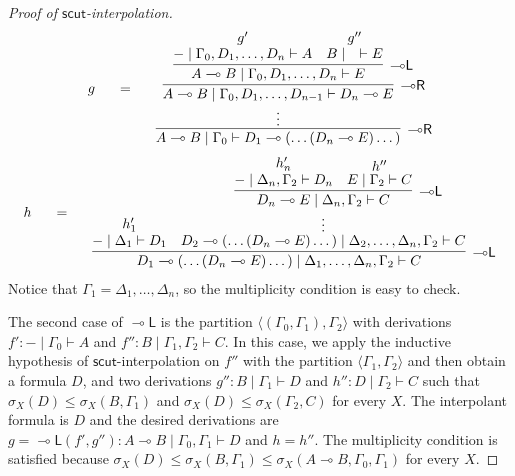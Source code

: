 \documentclass[sn-mathphys-num]{sn-jnl}%
\newcommand{\GG}{\Gamma}
\newcommand{\GD}{\Delta}
\newcommand{\vd}{\vdash}
\newcommand{\lolli}{\multimap}
\newcommand{\lleft}{{\lolli}\mathsf{L}}
\newcommand{\lright}{{\lolli}\mathsf{R}}
\newcommand{\mf}[1]{\mathsf{#1}}
\newcommand{\gs}[1]{\sigma_{X} (#1)}
\theoremstyle{thmstyleone}%
\theoremstyle{thmstyletwo}%
\theoremstyle{thmstylethree}%
\begin{document}
\begin{proof}[Proof of $\mf{scut}$-interpolation]
\begin{displaymath}
\begin{array}{c}
  \begin{array}{c}
    g
  \end{array}
  \quad 
  =
  \quad
    \begin{array}{c}
      \infer[\lright]{A\lolli B \mid \GG_0 \vd D_1 \lolli (\dots (D_n \lolli E)\dots)}{
      \deduce{\vdots}{
        \infer[\lright]{A \lolli B \mid \GG_0 , D_1, \dots ,D_{n-1} \vd D_n \lolli E}{
        \infer[\lleft]{A \lolli B \mid \GG_0 , D_1, \dots, D_n \vd E}{
          \deduce{{-} \mid \GG_0 , D_1, \dots, D_n \vd A}{g'}
          &
          \deduce{B \mid \quad \vd E}{g''}
        }
      }
      }
    }
    \end{array}
  \end{array}
\end{displaymath}
\begin{displaymath}
    \begin{array}{c}
      h
    \end{array}
    \quad
    =
    \quad
    \begin{array}{c}
      \infer[\lleft]{D_1 \lolli (\dots (D_n \lolli E)\dots) \mid \GD_1, \dots, \GD_n, \GG_2 \vd C}{
      \deduce{{-} \mid \GD_1 \vd D_1}{h'_1}
      &
      \deduce{D_2 \lolli (\dots (D_n \lolli E)\dots) \mid \GD_2, \dots, \GD_n, \GG_2 \vd C}{
        \deduce{\vdots}{
          \infer[\lleft]{D_n \lolli E \mid \GD_n, \GG_2 \vd C}{
            \deduce{{-} \mid \GD_n, \GG_2 \vd D_n}{h'_n}
            &
            \deduce{E \mid \GG_2 \vd C}{h''}
          }
        }
      }
    }
    \end{array}
\end{displaymath}
Notice that $\GG_1 = \GD_1, \dots, \GD_n$, so the multiplicity condition is easy to check.

The second case of $\lleft$ is the partition $\langle (\GG_0 , \GG_1) , \GG_2 \rangle$ with derivations $f' : {-} \mid \GG_0 \vd A$ and $f'' : B \mid \GG_1 , \GG_2 \vd C$.
In this case, we apply the inductive hypothesis of $\mf{scut}$-interpolation on $f''$ with the partition $\langle \GG_1 , \GG_2 \rangle$ and then obtain a formula $D$, and two derivations $g'' : B \mid \GG_1 \vd D$ and $h'' : D \mid \GG_2 \vd C$ such that $\gs{D} \leq \gs{B , \GG_1}$ and $ \gs{D} \leq \gs{\GG_2 , C}$ for every $X$.
The interpolant formula is $D$ and the desired derivations are $g = \lleft (f' , g'') : A \lolli B \mid \GG_0 , \GG_1 \vd D$ and $h = h''$.
The multiplicity condition is satisfied because $\gs{D} \leq \gs{B , \GG_1} \leq \gs{A \lolli B , \GG_0 , \GG_1}$ for every $X$.
\end{proof}
\end{document}
